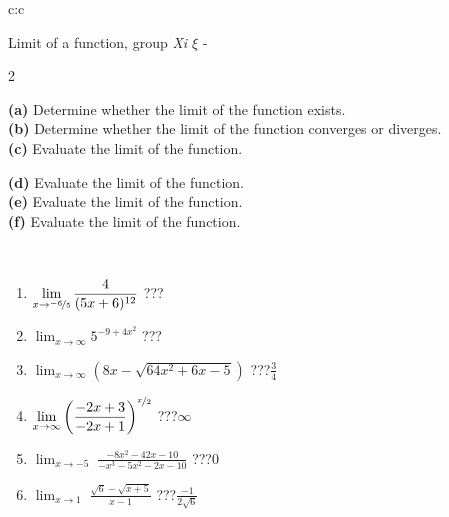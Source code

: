 \documentclass[10pt]{report}
\begin{document}
\newpage
\thispagestyle{empty}
\begin{tabular}{c:c}
\begin{minipage}[c][104.5mm][t]{0.5\linewidth}
\begin{center}
\vspace{5mm}
{\huge Limit of a function, group \textit{Xi $\xi$} -}\\[5mm]
\begin{minipage}{0.95\linewidth}
\begin{center}
{\small \begin{multicols}{2} \raggedright
\textbf{(a)} Determine whether the limit of the function exists. \\[1mm]
\textbf{(b)} Determine whether the limit of the function converges or diverges. \\[1mm]
\textbf{(c)} Evaluate the limit of the function. \par \columnbreak
\textbf{(d)} Evaluate the limit of the function. \\[1mm]
\textbf{(e)} Evaluate the limit of the function. \\[1mm]
\textbf{(f)} Evaluate the limit of the function. \\[1mm]
\end{multicols}
}
\end{center}
\end{minipage}
\\[1mm]
\begin{minipage}{0.79\linewidth}
\begin{center}
\begin{varwidth}{\linewidth}
\setlength{\itemsep}{0pt}
\begin{enumerate}
\normalsize
\item $\displaystyle\lim_{x\to\nicefrac{-6}{5}}{\frac{4}{(5x+6)^{12}}}$\quad \dotfill\; ???\;\dotfill \quad {}
\item $\displaystyle\lim_{x\to\infty}{5^{-9+4x^2}}$\quad \dotfill\; ???\;\dotfill \quad {}
\item $\displaystyle\lim_{x\to\infty}{\left(8x - \sqrt{64x^2+6x-5}\right)}$\quad \dotfill\; ???\;\dotfill \quad $\frac{3}{4}$
\item $\displaystyle\lim_{x\to\infty}{\left( \frac{-2x+3}{-2x+1} \right)^{\nicefrac{x}{2}}}$\quad \dotfill\; ???\;\dotfill \quad $\infty$
\item $\displaystyle\lim_{x\to -5}{\;\frac{-8x^2-42x-10}{-x^3-5x^2-2x-10}}$\quad \dotfill\; ???\;\dotfill \quad $0$
\item $\displaystyle\lim_{x\to 1}{\;\frac{\sqrt{6}-\sqrt{x+5}}{x-1}}$\quad \dotfill\; ???\;\dotfill \quad $\frac{-1}{2\sqrt{6}}$

\end{enumerate}
\end{varwidth}
\end{center}
\end{minipage}
\end{center}
\end{minipage}
\end{tabular}
\end{document}
